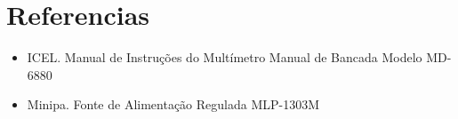 \newpage
\section{Referencias}
    \begin{itemize}
        \item ICEL. Manual de Instruções do Multímetro Manual de Bancada Modelo MD-6880
        \item Minipa. Fonte de Alimentação Regulada MLP-1303M
    \end{itemize}
